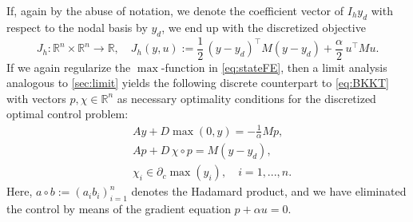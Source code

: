\documentclass[reqno]{shinyart}
\begin{document}
If, again by the abuse of notation, we denote the coefficient vector of $I_h y_d$ with respect to the nodal basis 
by $y_d$, we end up with the discretized objective 
\begin{equation*}
    J_h : {\mathbb{R}}^n \times {\mathbb{R}}^n \to {\mathbb{R}}, \quad 
    J_h(y,u) := \frac{1}{2}\, (y - y_d)^\top M (y - y_d) + \frac{\alpha}{2}\, u^\top M u.
\end{equation*}
If we again regularize the $\max$-function in \eqref{eq:stateFE}, then a limit analysis analogous to 
\cref{sec:limit} yields the following discrete counterpart to \eqref{eq:BKKT} with 
vectors $p, \chi\in {\mathbb{R}}^n$ as necessary optimality conditions for the discretized optimal control problem:
\begin{subequations}\label{eq:BKKTFE}
    \begin{align}
        &A y + D \max(0,y) = - \frac{1}{\alpha} M p, \label{eq:BKKTFE1}\\
        &A p + D\,\chi \circ p = M (y - y_d), \label{eq:BKKTFE2}\\
        &\chi_i \in \partial_c \max(y_i), \quad i = 1, ..., n. \label{eq:BKKTFE3}
    \end{align}
\end{subequations}
Here, $a\circ b := (a_i b_i)_{i=1}^n$ denotes the Hadamard product, and we have eliminated 
the control by means of the gradient equation $p + \alpha u = 0$.
\end{document}

